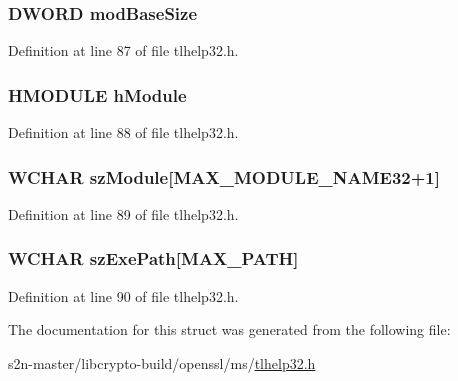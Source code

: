 \subsubsection[{\texorpdfstring{mod\+Base\+Size}{modBaseSize}}]{\setlength{\rightskip}{0pt plus 5cm}D\+W\+O\+RD mod\+Base\+Size}\hypertarget{structtag_m_o_d_u_l_e_e_n_t_r_y32_w_a98886f2c939d29359f700bea645b9cf6}{}\label{structtag_m_o_d_u_l_e_e_n_t_r_y32_w_a98886f2c939d29359f700bea645b9cf6}


Definition at line 87 of file tlhelp32.\+h.

\subsubsection[{\texorpdfstring{h\+Module}{hModule}}]{\setlength{\rightskip}{0pt plus 5cm}H\+M\+O\+D\+U\+LE h\+Module}\hypertarget{structtag_m_o_d_u_l_e_e_n_t_r_y32_w_ae3642ec58b041930c54b501841cc736d}{}\label{structtag_m_o_d_u_l_e_e_n_t_r_y32_w_ae3642ec58b041930c54b501841cc736d}


Definition at line 88 of file tlhelp32.\+h.

\subsubsection[{\texorpdfstring{sz\+Module}{szModule}}]{\setlength{\rightskip}{0pt plus 5cm}W\+C\+H\+AR sz\+Module\mbox{[}{\bf M\+A\+X\+\_\+\+M\+O\+D\+U\+L\+E\+\_\+\+N\+A\+M\+E32}+1\mbox{]}}\hypertarget{structtag_m_o_d_u_l_e_e_n_t_r_y32_w_aa0df979e7e2752d691cf2f481e293741}{}\label{structtag_m_o_d_u_l_e_e_n_t_r_y32_w_aa0df979e7e2752d691cf2f481e293741}


Definition at line 89 of file tlhelp32.\+h.

\subsubsection[{\texorpdfstring{sz\+Exe\+Path}{szExePath}}]{\setlength{\rightskip}{0pt plus 5cm}W\+C\+H\+AR sz\+Exe\+Path\mbox{[}M\+A\+X\+\_\+\+P\+A\+TH\mbox{]}}\hypertarget{structtag_m_o_d_u_l_e_e_n_t_r_y32_w_ac8404fb1b0e1abfc9350bcb72318c12b}{}\label{structtag_m_o_d_u_l_e_e_n_t_r_y32_w_ac8404fb1b0e1abfc9350bcb72318c12b}


Definition at line 90 of file tlhelp32.\+h.



The documentation for this struct was generated from the following file\+:\begin{DoxyCompactItemize}
\item 
s2n-\/master/libcrypto-\/build/openssl/ms/\hyperlink{tlhelp32_8h}{tlhelp32.\+h}\end{DoxyCompactItemize}
